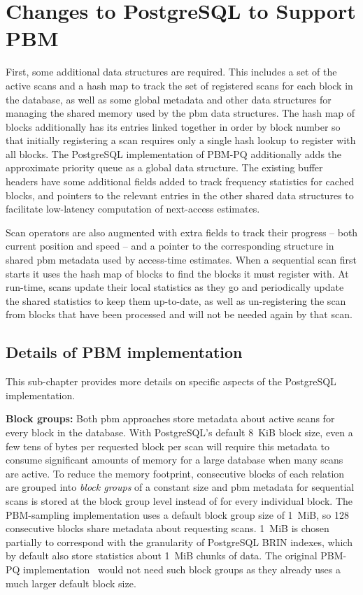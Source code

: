 \section{Changes to PostgreSQL to Support PBM}

First, some additional data structures are required. This includes a set of the active scans and a hash map to track the set of registered scans for each block in the database, as well as some global metadata and other data structures for managing the shared memory used by the \gls{pbm} data structures. The hash map of blocks additionally has its entries linked together in order by block number so that initially registering a scan requires only a single hash lookup to register with all blocks. The PostgreSQL implementation of PBM-PQ additionally adds the approximate priority queue as a global data structure. The existing buffer headers have some additional fields added to track frequency statistics for cached blocks, and pointers to the relevant entries in the other shared data structures to facilitate low-latency computation of next-access estimates. 

Scan operators are also augmented with extra fields to track their progress -- both current position and speed -- and a pointer to the corresponding structure in shared \gls{pbm} metadata used by access-time estimates. When a sequential scan first starts it uses the hash map of blocks to find the blocks it must register with. At run-time, scans update their local statistics as they go and periodically update the shared statistics to keep them up-to-date, as well as un-registering the scan from blocks that have been processed and will not be needed again by that scan.


\subsection{Details of PBM implementation}

This sub-chapter provides more details on specific aspects of the PostgreSQL implementation.


\textbf{Block groups:} Both \gls{pbm} approaches store metadata about active scans for every block in the database. With PostgreSQL's default 8~KiB block size, even a few tens of bytes per requested block per scan will require this metadata to consume significant amounts of memory for a large database when many scans are active. To reduce the memory footprint, consecutive blocks of each relation are grouped into \textit{block groups} of a constant size and \gls{pbm} metadata for sequential scans is stored at the block group level instead of for every individual block. The PBM-sampling implementation uses a default block group size of 1~MiB, so 128 consecutive blocks share metadata about requesting scans. 1~MiB is chosen partially to correspond with the granularity of PostgreSQL BRIN indexes, which by default also store statistics about 1~MiB chunks of data. The original PBM-PQ implementation~\cite{pbm} would not need such block groups as they already uses a much larger default block size. \cite{vectorDocs}  %


